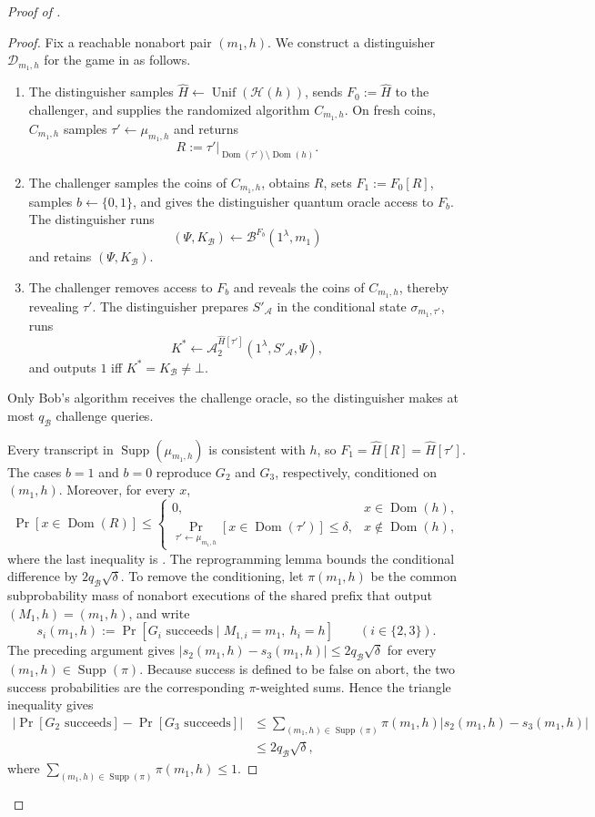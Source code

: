 \documentclass[11pt]{article}
\newcounter{algorithm}
\newcommand{\bits}{\{0,1\}}
\newcommand{\cA}{\mathcal{A}}
\newcommand{\cB}{\mathcal{B}}
\newcommand{\cD}{\mathcal{D}}
\newcommand{\cH}{\mathcal{H}}
\newcommand{\Dom}{\operatorname{Dom}}
\newcommand{\Unif}{\operatorname{Unif}}
\newcommand{\Supp}{\operatorname{Supp}}
\begin{document}
\begin{proof}[Proof of ]
\begin{proof}
Fix a reachable nonabort pair \((m_1,h)\). We construct a distinguisher
\(\cD_{m_1,h}\) for the game in  as follows.
\begin{enumerate}[leftmargin=2em]
  \item The distinguisher samples
  \(\widehat H\leftarrow\Unif(\cH(h))\), sends
  \(F_0:=\widehat H\) to the challenger, and supplies the randomized
  algorithm \(C_{m_1,h}\). On fresh coins, \(C_{m_1,h}\) samples
  \(\tau'\leftarrow\mu_{m_1,h}\) and returns
  \[
    R:=\tau'|_{\Dom(\tau')\setminus\Dom(h)}.
  \]
  \item The challenger samples the coins of \(C_{m_1,h}\), obtains \(R\),
  sets \(F_1:=F_0[R]\), samples \(b\leftarrow\bits\), and gives the
  distinguisher quantum oracle access to \(F_b\). The distinguisher runs
  \[
    (\Psi,K_{\cB})
    \leftarrow\cB^{F_b}(1^\lambda,m_1)
  \]
  and retains \((\Psi,K_{\cB})\).
  \item The challenger removes access to \(F_b\) and reveals the coins of
  \(C_{m_1,h}\), thereby revealing \(\tau'\). The distinguisher prepares
  \(S'_{\cA}\) in the conditional state \(\sigma_{m_1,\tau'}\), runs
  \[
    K^*\leftarrow
    \cA_2^{\widehat H[\tau']}
    (1^\lambda,S'_{\cA},\Psi),
  \]
  and outputs \(1\) iff \(K^*=K_{\cB}\neq\bot\).
\end{enumerate}
Only Bob's algorithm receives the challenge oracle, so the distinguisher
makes at most \(q_{\cB}\) challenge queries.

Every transcript in \(\Supp(\mu_{m_1,h})\) is consistent with \(h\),
so \(F_1=\widehat H[R]=\widehat H[\tau']\). The cases \(b=1\) and \(b=0\)
reproduce \(G_2\) and \(G_3\), respectively, conditioned on \((m_1,h)\).
Moreover, for every \(x\),
\[
  \Pr[x\in\Dom(R)]
  \le
  \begin{cases}
    0,&x\in\Dom(h),\\
    \Pr_{\tau'\leftarrow\mu_{m_1,h}}
      [x\in\Dom(\tau')]\le\delta,&x\notin\Dom(h),
  \end{cases}
\]
where the last inequality is . The reprogramming
lemma bounds the conditional difference by \(2q_{\cB}\sqrt\delta\).
To remove the conditioning, let \(\pi(m_1,h)\) be the common subprobability
mass of nonabort executions of the shared prefix that output
\((M_1,h)=(m_1,h)\), and write
\[
  s_i(m_1,h)
  :=
  \Pr[G_i\text{ succeeds}\mid M_{1,i}=m_1,\ h_i=h]
  \qquad (i\in\{2,3\}).
\]
The preceding argument gives
\(\lvert s_2(m_1,h)-s_3(m_1,h)\rvert
\le 2q_{\cB}\sqrt\delta\) for every \((m_1,h)\in\Supp(\pi)\).
Because success is defined to be false on abort, the two success
probabilities are the corresponding \(\pi\)-weighted sums. Hence the triangle
inequality gives
\[
  \begin{aligned}
  \left|\Pr[G_2\text{ succeeds}]-\Pr[G_3\text{ succeeds}]\right|
  &\le
  \sum_{(m_1,h)\in\Supp(\pi)}\pi(m_1,h)
    \left|s_2(m_1,h)-s_3(m_1,h)\right|\\
  &\le 2q_{\cB}\sqrt\delta,
  \end{aligned}
\]
where \(\sum_{(m_1,h)\in\Supp(\pi)}\pi(m_1,h)\le1\).
\end{proof}


\end{proof}
\end{document}
